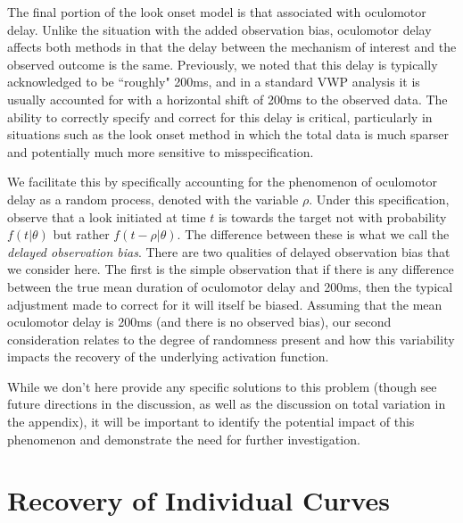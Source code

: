 The final portion of the look onset model is that associated with oculomotor delay. Unlike the situation with the added observation bias, oculomotor delay affects both methods in that the delay between the mechanism of interest and the observed outcome is the same. Previously, we noted that this delay is typically acknowledged to be ``roughly" 200ms, and in a standard VWP analysis it is usually accounted for with a horizontal shift of 200ms to the observed data. The ability to correctly specify and correct for this delay is critical, particularly in situations such as the look onset method in which the total data is much sparser and potentially much more sensitive to misspecification. 

We facilitate this by specifically accounting for the phenomenon of oculomotor delay as a random process, denoted with the variable $\rho$. Under this specification, observe that a look initiated at time $t$ is towards the target not with probability $f(t|\theta)$ but rather $f(t - \rho | \theta)$. The difference between these is what we call the \textit{delayed observation bias}. There are two  qualities of delayed observation bias that we consider here. The first is the simple observation that if there is any difference between the true mean duration of oculomotor delay and 200ms, then the typical adjustment made to correct for it will itself be biased. Assuming that the mean oculomotor delay is 200ms (and there is no observed bias), our second consideration relates to the degree of randomness present and how this variability impacts the recovery of the underlying activation function.

While we don't here provide any specific solutions to this problem (though see future directions in the discussion, as well as the discussion on total variation in the appendix), it will be important to identify the potential impact of this phenomenon and demonstrate the need for further investigation.





\section{Recovery of Individual Curves}\label{sec:ind_curves}



